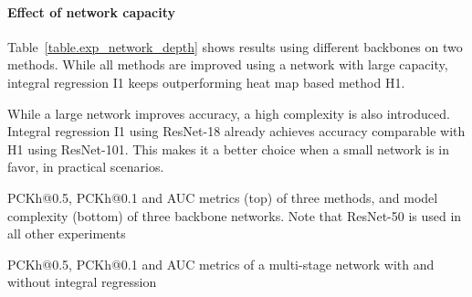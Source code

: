 \documentclass[runningheads]{llncs}
\begin{document}
\paragraph{\textbf{Effect of network capacity}}
Table~\ref{table.exp_network_depth} shows results using different backbones on two methods. While all methods are improved using a network with large capacity, integral regression I1 keeps outperforming heat map based method H1.

While a large network improves accuracy, a high complexity is also introduced. Integral regression I1 using ResNet-18 already achieves accuracy comparable with H1 using ResNet-101. This makes it a better choice when a small network is in favor, in practical scenarios.

\noindent
\makeatletter\def\@captype{table}\makeatother
\begin{minipage}{.6\textwidth}
\caption{PCKh@0.5, PCKh@0.1 and AUC metrics (top) of three methods, and model complexity (bottom) of three backbone networks. Note that ResNet-50 is used in all other experiments}

\label{table.exp_network_depth}
\end{minipage}
\makeatletter\def\@captype{table}\makeatother
\begin{minipage}{.39\textwidth}
\caption{PCKh@0.5, PCKh@0.1 and AUC metrics of a multi-stage network with and without integral regression}

\label{table.exp_multi_stage}
\end{minipage}
\end{document}
